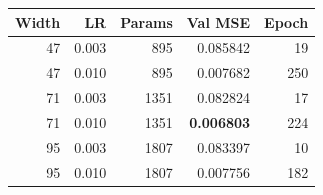 \begin{center}
\small
\setlength{\tabcolsep}{4pt}
\begin{tabular}{@{}rrrrr@{}}
\toprule
Width & LR & Params & Val MSE & Epoch\\
\midrule
47 & 0.003 & 895 & 0.085842 & 19\\
47 & 0.010 & 895 & 0.007682 & 250\\
71 & 0.003 & 1351 & 0.082824 & 17\\
71 & 0.010 & 1351 & \textbf{0.006803} & 224\\
95 & 0.003 & 1807 & 0.083397 & 10\\
95 & 0.010 & 1807 & 0.007756 & 182\\
\bottomrule
\end{tabular}
\end{center}